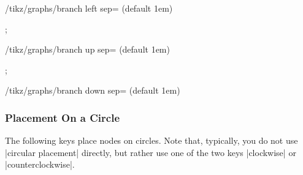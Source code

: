 \begin{key}{/tikz/graphs/branch left sep= (default 1em)}
\begin{codeexample}[]
\tikz {};      
\end{codeexample}
\end{key}

\begin{key}{/tikz/graphs/branch up sep= (default 1em)}
\begin{codeexample}[]
\tikz {};      
\end{codeexample}
\end{key}

\begin{key}{/tikz/graphs/branch down sep= (default 1em)}
\end{key}



\subsubsection{Placement On a Circle}

The following keys place nodes on circles. Note that, typically, you
do not use |circular placement| directly, but rather use one of the
two keys |clockwise| or |counterclockwise|.

